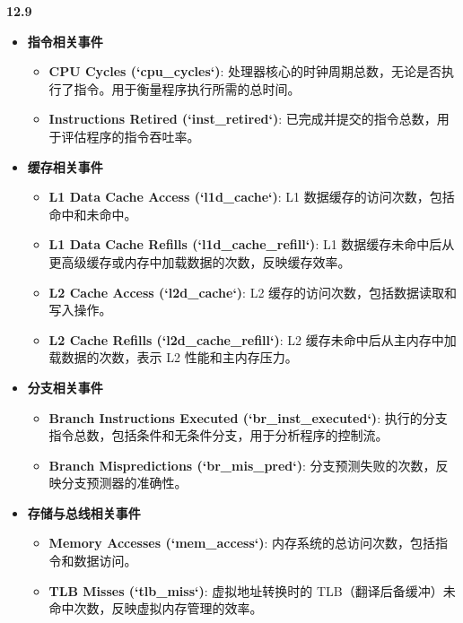 \documentclass[UTF8]{report}
\begin{document}
\noindent
\textbf{12.9}

\begin{itemize}
    \item \textbf{指令相关事件}
    \begin{itemize}
        \item \textbf{CPU Cycles (`cpu\_cycles`)}: 处理器核心的时钟周期总数，无论是否执行了指令。用于衡量程序执行所需的总时间。
        \item \textbf{Instructions Retired (`inst\_retired`)}: 已完成并提交的指令总数，用于评估程序的指令吞吐率。
    \end{itemize}

    \item \textbf{缓存相关事件}
    \begin{itemize}
        \item \textbf{L1 Data Cache Access (`l1d\_cache`)}: L1 数据缓存的访问次数，包括命中和未命中。
        \item \textbf{L1 Data Cache Refills (`l1d\_cache\_refill`)}: L1 数据缓存未命中后从更高级缓存或内存中加载数据的次数，反映缓存效率。
        \item \textbf{L2 Cache Access (`l2d\_cache`)}: L2 缓存的访问次数，包括数据读取和写入操作。
        \item \textbf{L2 Cache Refills (`l2d\_cache\_refill`)}: L2 缓存未命中后从主内存中加载数据的次数，表示 L2 性能和主内存压力。
    \end{itemize}

    \item \textbf{分支相关事件}
    \begin{itemize}
        \item \textbf{Branch Instructions Executed (`br\_inst\_executed`)}: 执行的分支指令总数，包括条件和无条件分支，用于分析程序的控制流。
        \item \textbf{Branch Mispredictions (`br\_mis\_pred`)}: 分支预测失败的次数，反映分支预测器的准确性。
    \end{itemize}

    \item \textbf{存储与总线相关事件}
    \begin{itemize}
        \item \textbf{Memory Accesses (`mem\_access`)}: 内存系统的总访问次数，包括指令和数据访问。
        \item \textbf{TLB Misses (`tlb\_miss`)}: 虚拟地址转换时的 TLB（翻译后备缓冲）未命中次数，反映虚拟内存管理的效率。
    \end{itemize}
\end{itemize}
\end{document}

